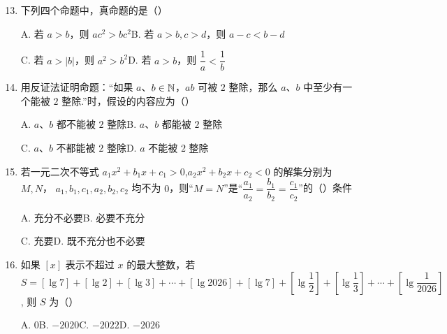 \documentclass[a4paper,11pt]{article}
\begin{document}

\begin{enumerate}
\setcounter{enumi}{12}

\item 下列四个命题中，真命题的是\mbox{（\quad）}

\keepwithprev
A. 若 $a>b$，则 $ac^2>bc^2$\qquad\qquad B. 若 $a>b,c>d$，则 $a-c<b-d$

C. 若 $a>\lvert b\rvert$，则 $a^2>b^2$\qquad\qquad D. 若 $a>b$，则 $\dfrac1a<\dfrac1b$

\ifanswer
\solbegin
{}
\solend
\fi

\item 用反证法证明命题：“如果 $a$、$b\in\mathbb{N}$，$ab$ 可被 $2$ 整除，那么 $a$、$b$ 中至少有一个能被 $2$ 整除.”时，假设的内容应为\mbox{（\quad）}%

\keepwithprev
A. $a$、$b$ 都不能被 $2$ 整除\qquad\qquad B. $a$、$b$ 都能被 $2$ 整除

C. $a$、$b$ 不都能被 $2$ 整除\qquad\qquad D. $a$ 不能被 $2$ 整除

\ifanswer
{}
\fi

\item 若一元二次不等式 $a_1x^2+b_1x+c_1>0$,$a_2x^2+b_2x+c_2<0$ 的解集分别为 $M,N$，\newline
$a_1,b_1,c_1,a_2,b_2,c_2$ 均不为 $0$，则“$M=N$”是“$\dfrac{a_1}{a_2}=\dfrac{b_1}{b_2}=\dfrac{c_1}{c_2}$”的\mbox{（\quad）}条件

\keepwithprev
A. 充分不必要\qquad\qquad B. 必要不充分

C. 充要\qquad\qquad D. 既不充分也不必要

\ifanswer
\solbegin
{}
\solend
\fi

\item 如果 $[x]$ 表示不超过 $x$ 的最大整数，若
$S=[\lg 7]+[\lg 2]+[\lg 3]+\cdots+[\lg 2026]+[\lg 7]+\left[\lg\dfrac12\right]+\left[\lg\dfrac13\right]+\cdots+\left[\lg\dfrac1{2026}\right]$,%
则 $S$ 为\mbox{（\quad）}

\keepwithprev
A. $0$\qquad\qquad B. $-2020$\qquad\qquad C. $-2022$\qquad\qquad D. $-2026$

\ifanswer
\solbegin
{}
\solend
\fi

\end{enumerate}
\end{document}

